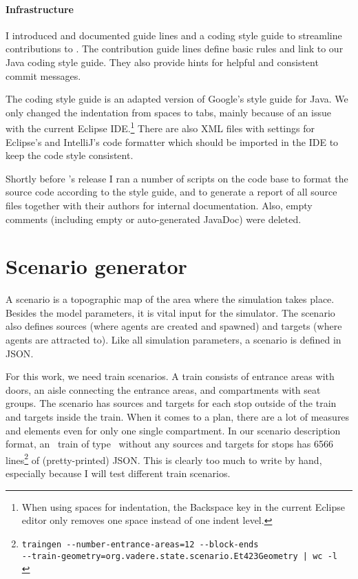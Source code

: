 \paragraph{Infrastructure}

I introduced and documented guide lines and a coding style guide to streamline
contributions to \vadere.
The contribution guide lines define basic rules and link to our Java coding style
guide.
They also provide hints for helpful and consistent commit messages.

The coding style guide is an adapted version of Google's style guide for Java.
We only changed the indentation from spaces to tabs, mainly because of an issue
with the current Eclipse \acs{IDE}.\footnote{
  When using spaces for indentation, the Backspace key in the current Eclipse
  editor only removes one space instead of one indent level.}
There are also \acs{XML} files with settings for Eclipse's and IntelliJ's code
formatter which should be imported in the \acs{IDE} to keep the code style
consistent.

Shortly before \vadere's release I ran a number of scripts on the code base to
format the source code according to the style guide, and to generate a report of
all source files together with their authors for internal documentation.
Also, empty comments (including empty or auto-generated JavaDoc) were deleted.

\section{Scenario generator}
\label{sec:traingen}

A scenario is a topographic map of the area where the simulation takes place.
Besides the model parameters, it is vital input for the simulator.
The scenario also defines sources (where agents are created and spawned) and
targets (where agents are attracted to).
Like all simulation parameters, a scenario is defined in \acs{JSON}.

For this work, we need train scenarios.
A train consists of entrance areas with doors, an aisle connecting the entrance
areas, and compartments with seat groups.
The scenario has sources and targets for each stop outside of the train and
targets inside the train.
When it comes to a plan, there are a lot of measures and elements even for only
one single compartment.
In our scenario description format, an \sbahn\ train of type \sbahntype\ without
any sources and targets for stops has 6566
lines\footnote{\verb~traingen --number-entrance-areas=12 --block-ends~ \\
\verb~--train-geometry=org.vadere.state.scenario.Et423Geometry | wc -l~ \\
\shellcmdline} of (pretty-printed) \acs{JSON}.
This is clearly too much to write by hand, especially because I will test
different train scenarios.

